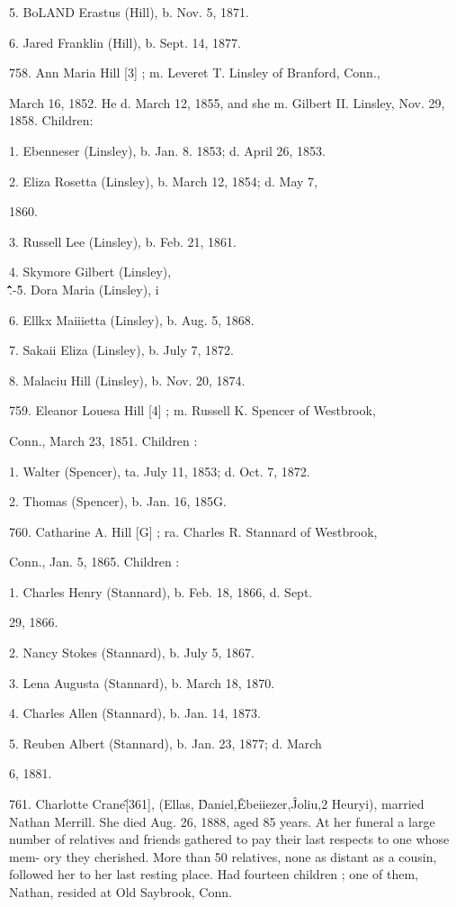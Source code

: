 \documentclass{book}
\begin{document}
5. BoLAND Erastus (Hill), b. Nov. 5, 1871. 

6. Jared Franklin (Hill), b. Sept. 14, 1877. 

758. Ann Maria Hill [3] ; m. Leveret T. Linsley of Branford, Conn., 

March 16, 1852. He d. March 12, 1855, and she m. Gilbert II. 
Linsley, Nov. 29, 1858. Children: 

1. Ebenneser (Linsley), b. Jan. 8. 1853; d. April 26, 1853. 

2. Eliza Rosetta (Linsley), b. March 12, 1854; d. May 7, 

1860. 

3. Russell Lee (Linsley), b. Feb. 21, 1861. 

4. Skymore Gilbert (Linsley), \\ \^ \^ \^\^ \^\^\^.-\^ 

5. Dora Maria (Linsley), i 

6. Ellkx Maiiietta (Linsley), b. Aug. 5, 1868. 

7. Sakaii Eliza (Linsley), b. July 7, 1872. 

8. Malaciu Hill (Linsley), b. Nov. 20, 1874. 




759. Eleanor Louesa Hill [4] ; m. Russell K. Spencer of Westbrook, 

Conn., March 23, 1851. Children : 

1. Walter (Spencer), ta. July 11, 1853; d. Oct. 7, 1872. 

2. Thomas (Spencer), b. Jan. 16, 185G. 

760. Catharine A. Hill [G] ; ra. Charles R. Stannard of Westbrook, 

Conn., Jan. 5, 1865. Children : 

1. Charles Henry (Stannard), b. Feb. 18, 1866, d. Sept. 

29, 1866. 

2. Nancy Stokes (Stannard), b. July 5, 1867. 

3. Lena Augusta (Stannard), b. March 18, 1870. 

4. Charles Allen (Stannard), b. Jan. 14, 1873. 

5. Reuben Albert (Stannard), b. Jan. 23, 1877; d. March 

6, 1881. 

761. Charlotte Crane\^ [361], (Ellas, \^ Daniel,\^ Ebeiiezer,\^ 
Joliu,2 Heuryi), married Nathan Merrill. She died Aug. 26, 
1888, aged 85 years. At her funeral a large number of relatives 
and friends gathered to pay their last respects to one whose mem- 
ory they cherished. More than 50 relatives, none as distant as 
a cousin, followed her to her last resting place. Had fourteen 
children ; one of them, Nathan, resided at Old Saybrook, Conn. 
\end{document}
